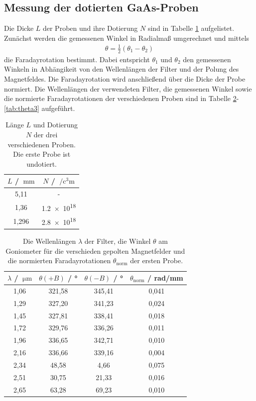 \subsection{Messung der dotierten GaAs-Proben}

Die Dicke $L$ der Proben und ihre Dotierung $N$ sind in Tabelle \ref{tab:ln} aufgelistet.
Zunächst werden die gemessenen Winkel in Radialmaß umgerechnet und mittels
\begin{align}
  \theta = \frac{1}{2}(\theta_1 - \theta_2)
\end{align}
die Faradayrotation bestimmt.
Dabei entspricht $\theta_1$ und $\theta_2$ den gemessenen Winkeln in Abhängikeit von den Wellenlängen der Filter und der Polung des Magnetfeldes.
Die Faradayrotation wird anschließend über die Dicke der Probe normiert.
Die Wellenlängen der verwendeten Filter, die gemessenen Winkel sowie die normierte Faradayrotationen der verschiedenen Proben sind in Tabelle \ref{tab:theta1}-\ref{tab:theta3} aufgeführt.

\begin{table}
  \centering
  \begin{tabular}{c c}
    \toprule
    $L$ / $\SI{}{\milli\metre}$ & $N$ / $\SI{}{\per\cubic\centi\metre}$ \\
    \midrule
      5,11  & - \\
      1,36  & \SI{1.2e18}{}\\
      1,296 & \SI{2.8e18}{}\\
    \bottomrule
  \end{tabular}
  \caption{Länge $L$ und Dotierung $N$ der drei verschiedenen Proben. Die erste Probe ist undotiert.}
  \label{tab:ln}
\end{table}



\begin{table}
  \centering
  \begin{tabular}{c c c c}
    \toprule
    $\lambda$ / $\SI{}{\micro\metre}$ & $\theta(+B)$ / ° & $\theta(-B)$ / ° & $\theta_{\mathrm{norm}}$ / rad/mm\\
    \midrule
        1,06  & 321,58 & 345,41 & 0,041  \\
        1,29  & 327,20 & 341,23 & 0,024  \\
        1,45  & 327,81 & 338,41 & 0,018  \\
        1,72  & 329,76 & 336,26 & 0,011  \\
        1,96  & 336,65 & 342,71 & 0,010  \\
        2,16  & 336,66 & 339,16 & 0,004  \\
        2,34  &  48,58 &   4,66 & 0,075  \\
        2,51  &  30,75 &  21,33 & 0,016  \\
        2,65  &  63,28 &  69,23 & 0,010  \\
    \bottomrule
  \end{tabular}
  \caption{Die Wellenlängen $\lambda$ der Filter, die Winkel $\theta$ am Goniometer für die verschieden gepolten Magnetfelder und die
  normierten Faradayrotationen $\theta_{\mathrm{norm}}$ der ersten Probe.}
  \label{tab:theta1}
\end{table}

